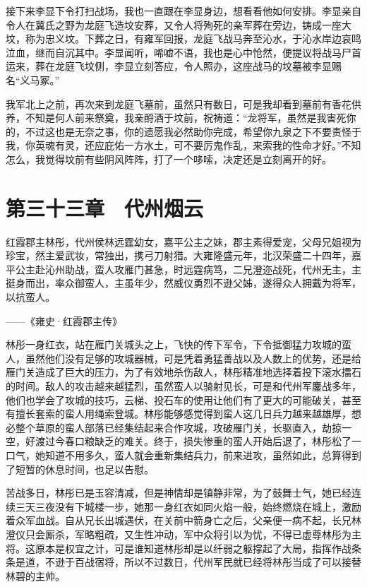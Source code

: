 接下来李显下令打扫战场，我也一直跟在李显身边，想看看他如何安排。李显亲自令人在冀氏之野为龙庭飞造坟安葬，又令人将殉死的亲军葬在旁边，铸成一座大坟，称为忠义坟。下葬之日，有雍军回报，龙庭飞战马奔至沁水，于沁水岸边哀鸣泣血，继而自沉其中。李显闻听，唏嘘不语，我也是心中怆然，便提议将战马尸首运来，葬在龙庭飞坟侧，李显立刻答应，令人照办，这座战马的坟墓被李显赐名“义马冢。”

我军北上之前，再次来到龙庭飞墓前，虽然只有数日，可是我却看到墓前有香花供养，不知是何人前来祭奠，我亲酹酒于坟前，祝祷道：“龙将军，虽然是我害死你的，不过这也是无奈之事，你的遗愿我必然助你完成，希望你九泉之下不要责怪于我，你英魂有灵，还应庇佑一方水土，可不要厉鬼作乱，来索我的性命才好。”不知怎么，我觉得坟前有些阴风阵阵，打了一个哆嗦，决定还是立刻离开的好。

\chapter{第三十三章　代州烟云}

红霞郡主林彤，代州侯林远霆幼女，嘉平公主之妹，郡主素得爱宠，父母兄姐视为珍宝，然主爱武妆，常独出，携弓刀射猎。大雍隆盛元年，北汉荣盛二十四年，嘉平公主赴沁州助战，蛮人攻雁门甚急，时远霆病笃，二兄澄迩战死，代州无主，主挺身而出，率众御蛮人，主虽年少，然威仪勇烈不逊父姊，遂得众人拥戴为将军，以抗蛮人。

——《雍史·红霞郡主传》

林彤一身红衣，站在雁门关城头之上，飞快的传下军令，下令抵御猛力攻城的蛮人，虽然他们没有足够的攻城器械，可是凭着勇猛善战以及人数上的优势，还是给雁门关造成了巨大的压力，为了有效地杀伤敌人，林彤精准地选择着投下滚水擂石的时间。敌人的攻击越来越猛烈，虽然蛮人以骑射见长，可是和代州军鏖战多年，他们也学会了攻城的技巧，云梯、投石车的使用让他们有了更大的可能破关，甚至有擅长套索的蛮人用绳索登城。林彤能够感觉得到蛮人这几日兵力越来越雄厚，想必整个草原的蛮人部落已经集结起来合作攻城，攻破雁门关，长驱直入，劫掠一空，好渡过今春口粮缺乏的难关。终于，损失惨重的蛮人开始后退了，林彤松了一口气，她知道不用多久，蛮人就会重新集结兵力，前来进攻，虽然如此，总算得到了短暂的休息时间，也足以告慰。

苦战多日，林彤已是玉容清减，但是神情却是镇静非常，为了鼓舞士气，她已经连续三天三夜没有下城楼一步，她那一身红衣如同火焰一般，始终燃烧在城上，激励着众军血战。自从兄长出城遇伏，在关前中箭身亡之后，父亲便一病不起，长兄林澄仪只会厮杀，军略粗疏，又生性冲动，军中众将引以为忧，不得已虚尊林彤为主将。这原本是权宜之计，可是谁知道林彤却是以纤弱之躯撑起了大局，指挥作战条条是道，不逊于百战宿将，所以不过数日，代州军民就已经将林彤当成了可以接替林碧的主帅。

